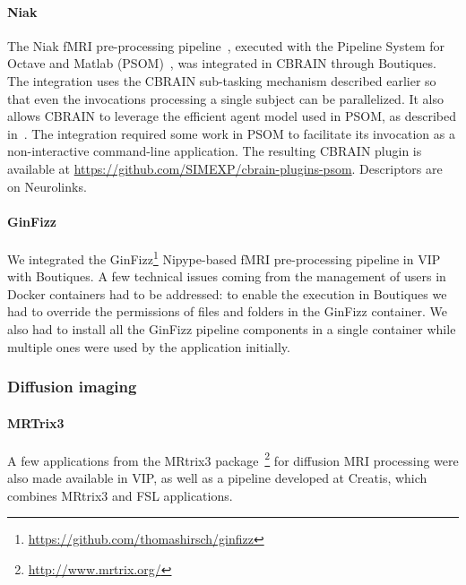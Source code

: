 \documentclass[a4paper,num-refs]{oup-contemporary}
\newcommand{\boutiques}{Boutiques\xspace}
\begin{document}
\paragraph{Niak} The Niak fMRI pre-processing pipeline~\cite{bellec2011neuroimaging}, executed with the Pipeline System
for Octave and Matlab (PSOM)~\cite{bellec2012pipeline}, was integrated
in CBRAIN through \boutiques. The integration uses the CBRAIN
sub-tasking mechanism described earlier so that even the invocations
processing a single subject can be parallelized. It also allows CBRAIN
to leverage the efficient agent model used in PSOM, as described
in~\cite{GLAT-16}. The integration required some work in PSOM to
facilitate its invocation as a non-interactive command-line
application. The resulting CBRAIN plugin is available at
\url{https://github.com/SIMEXP/cbrain-plugins-psom}.  Descriptors
are on Neurolinks.

\paragraph{GinFizz}
We integrated the
GinFizz\footnote{\url{https://github.com/thomashirsch/ginfizz}}
Nipype-based fMRI pre-processing pipeline in VIP with \boutiques.  A
few technical issues coming from the management of users in Docker
containers had to be addressed: to enable the execution in \boutiques
we had to override the permissions of files and folders in the GinFizz
container. We also had to install all the GinFizz pipeline components
in a single container while multiple ones were used by the application
initially.


\subsubsection{Diffusion imaging}

\paragraph{MRTrix3}
A few applications from the MRtrix3
package~\cite{tournier2012mrtrix}\footnote{\url{http://www.mrtrix.org/}} for diffusion MRI processing were also made available in VIP,
as well as a pipeline developed at Creatis, which combines MRtrix3 and
FSL applications.
\end{document}
